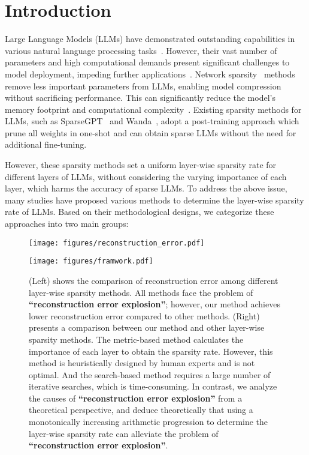 \section{Introduction}\label{sec:intro}
Large Language Models (LLMs) have demonstrated outstanding capabilities in various natural language processing tasks~\cite{llama3, yang2024qwen2, liu2024deepseek}. However, their vast number of parameters and high computational demands present significant challenges to model deployment, impeding further applications~\cite{zhu2024survey, wang2024model}. Network sparsity~\cite{rao2021dynamicvit, paul2022unmasking, wangntk} methods remove less important parameters from LLMs, enabling model compression without sacrificing performance. This can significantly reduce the model's memory footprint and computational complexity~\cite{li2024lorap, an2024fluctuation}. Existing sparsity methods for LLMs, such as SparseGPT~\cite{frantar2023sparsegpt} and Wanda~\cite{sun2023simple}, adopt a post-training approach which prune all weights in one-shot and can obtain sparse LLMs without the need for additional fine-tuning. 

However, these sparsity methods set a uniform layer-wise sparsity rate for different layers of LLMs, without considering the varying importance of each layer, which harms the accuracy of sparse LLMs. To address the above issue, many studies have proposed various methods to determine the layer-wise sparsity rate of LLMs. Based on their methodological designs, we categorize these approaches into two main groups:

\begin{figure*}[t]
    \centering
    \begin{minipage}[b]{0.3\textwidth}
        \centering
        \texttt{[image: figures/reconstruction\_error.pdf]}
    \end{minipage}
    \hfill
    \begin{minipage}[b]{0.69\textwidth}
        \centering
        \texttt{[image: figures/framwork.pdf]}
    \end{minipage}
    \caption{(Left) shows the comparison of reconstruction error among different layer-wise sparsity methods. All methods face the problem of \textbf{``reconstruction error explosion''}; however, our method achieves lower reconstruction error compared to other methods. (Right) presents a comparison between our method and other layer-wise sparsity methods. The metric-based method calculates the importance of each layer to obtain the sparsity rate. However, this method is heuristically designed by human experts and is not optimal. And the search-based method requires a large number of iterative searches, which is time-consuming. In contrast, we analyze the causes of \textbf{``reconstruction error explosion''} from a theoretical perspective, and deduce theoretically that using a monotonically increasing arithmetic progression to determine the layer-wise sparsity rate can alleviate the problem of \textbf{``reconstruction error explosion''}.}
    \label{fig:framework}
\end{figure*}


